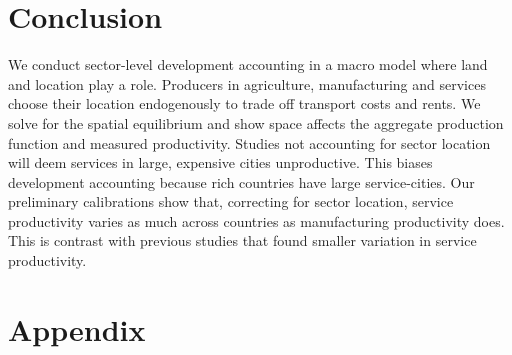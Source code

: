 \documentclass[12pt]{article}
\newcommand{\dofigure}[3]{\begin{figure}
\begin{centering}
\texttt{[image: figures/\#1]}
  \caption{#2\label{fig:#1}}
\end{centering}

\noindent \footnotesize{#3}
\end{figure}}
\begin{document}
%
%
%
%




\section{Conclusion}
We conduct sector-level development accounting in a macro model where land and location play a role. Producers in agriculture, manufacturing and services choose their location endogenously to trade off transport costs and rents. We solve for the spatial equilibrium and show space affects the aggregate production function and measured productivity. Studies not accounting for sector location will deem services in large, expensive cities unproductive. This biases development accounting because rich countries have large service-cities. Our preliminary calibrations show that, correcting for sector location, service productivity varies as much across countries as manufacturing productivity does. This is contrast with previous studies that found smaller variation in service productivity.

\clearpage





\clearpage

\section{Appendix}
\end{document}

